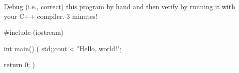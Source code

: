 Debug (i.e., correct) this program by hand 
and then verify by running it 
with your C++ compiler.
3 minutes!
\begin{console}
#include (iostream)

int main()
(
    std;;cout < "Hello, world!\n";

    return 0;
)
\end{console}
